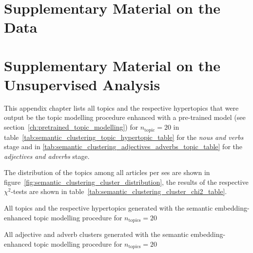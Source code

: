 \renewcommand{\imagepath}{../90-appendix/img}

\appendix

\chapter{Supplementary Material on the Data}\label{ch:data_appendix}



\chapter{Supplementary Material on the Unsupervised Analysis}\label{ch:unsupervised_appendix}
This appendix chapter lists all topics and the respective hypertopics that were output be the topic modelling procedure enhanced with a pre-trained model (see section~\ref{ch:pretrained_topic_modelling}) for $n_\text{topic} = 20$ in table~\ref{tab:semantic_clustering_topic_hypertopic_table} for the \textit{nous and verbs} stage and in \ref{tab:semantic_clustering_adjectives_adverbs_topic_table} for the \textit{adjectives and adverbs} stage.

The distribution of the topics among all articles per \gls{ses} are shown in figure~\ref{fig:semantic_clustering_cluster_distribution}, the results of the respective $\chi^2$-tests are shown in table~\ref{tab:semantic_clustering_cluster_chi2_table}.
\begin{table}[h]
    \centering
    
    \caption{All topics and the respective hypertopics generated with the semantic embedding-enhanced topic modelling procedure for $n_\text{topics}=20$}\label{tab:semantic_clustering_topic_hypertopic_table}
\end{table}

\begin{table}
    \centering
    
    \caption{All adjective and adverb clusters generated with the semantic embedding-enhanced topic modelling procedure for $n_\text{topics}=20$}\label{tab:semantic_clustering_adjectives_adverbs_topic_table}
\end{table}


